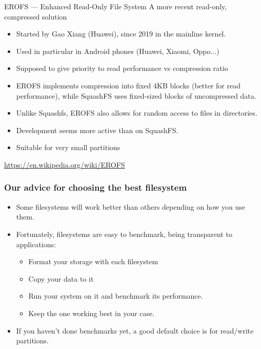 \begin{frame}{EROFS --- Enhanced Read-Only File System}
    A more recent read-only, compressed solution
    \begin{itemize}
        \item Started by Gao Xiang (Huawei), since 2019 in the mainline kernel.
        \item Used in particular in Android phones (Huawei, Xiaomi, Oppo...)
        \item Supposed to give priority to read performance vs compression ratio
        \item EROFS implements compression into fixed 4KB blocks (better for read
              performance), while SquashFS uses fixed-sized blocks of uncompressed
              data.
        \item Unlike Squashfs, EROFS also allows for random access to files in
              directories.
        \item Development seems more active than on SquashFS.
        \item Suitable for very small partitions
    \end{itemize}
    \url{https://en.wikipedia.org/wiki/EROFS}
\end{frame}

\begin{frame}
  \frametitle{Our advice for choosing the best filesystem}
  \begin{itemize}
     \item Some filesystems will work better than others
           depending on how you use them.
     \item Fortunately, filesystems are easy to benchmark, being
           transparent to applications:
           \begin{itemize}
             \item Format your storage with each filesystem
	     \item Copy your data to it
	     \item Run your system on it and benchmark its
                   performance.
	     \item Keep the one working best in your case.
           \end{itemize}
     \item If you haven't done benchmarks yet, a good default choice
           is  for read/write partitions.
  \end{itemize}
\end{frame}

